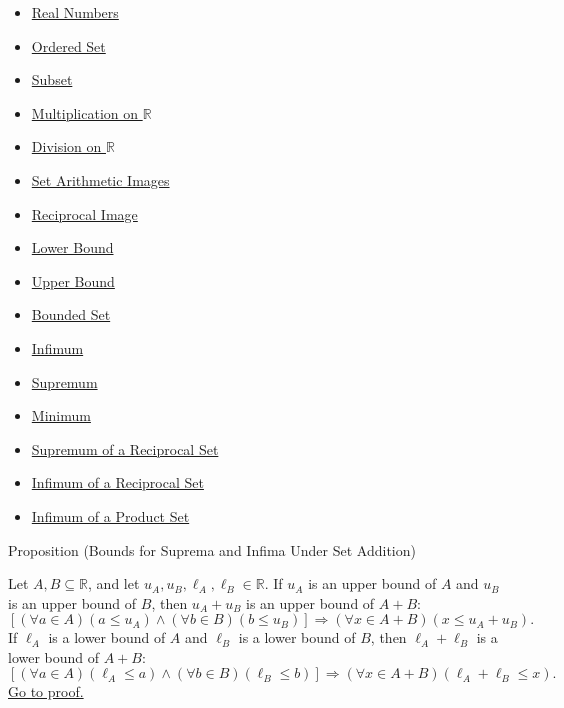 \begin{dependencies}
\begin{itemize}
  \item \hyperref[def:reals]{Real Numbers}
  \item \hyperref[def:ordered-set]{Ordered Set}
  \item \hyperref[def:subset]{Subset}
  \item \hyperref[def:multiplication-on-r]{Multiplication on $\mathbb{R}$}
  \item \hyperref[def:division-on-r]{Division on $\mathbb{R}$}
  \item \hyperref[def:set-arithmetic-images]{Set Arithmetic Images}
  \item \hyperref[def:reciprocal-image]{Reciprocal Image}
  \item \hyperref[def:real-lower-bound]{Lower Bound}
  \item \hyperref[def:real-upper-bound]{Upper Bound}
  \item \hyperref[def:bounded]{Bounded Set}
  \item \hyperref[def:infimum]{Infimum}
  \item \hyperref[def:supremum]{Supremum}
  \item \hyperref[def:minimum]{Minimum}
  \item \hyperref[thm:supremum-reciprocal-set]{Supremum of a Reciprocal Set}
  \item \hyperref[thm:infimum-reciprocal-set]{Infimum of a Reciprocal Set}
  \item \hyperref[thm:infimum-product-set]{Infimum of a Product Set}
\end{itemize}
\end{dependencies}

\begin{propositionbox}{Proposition (Bounds for Suprema and Infima Under Set Addition)}
\begin{proposition}
\label{prop:bounds-sum-set}
Let $A,B\subseteq\mathbb{R}$, and let
$u_A,u_B,\ell_A,\ell_B\in\mathbb{R}$.  If $u_A$ is an upper bound of $A$ and
$u_B$ is an upper bound of $B$, then $u_A+u_B$ is an upper bound of $A+B$:
\[
  \left[(\forall a\in A)(a\leq u_A)\land
  (\forall b\in B)(b\leq u_B)\right]
  \Longrightarrow
  (\forall x\in A+B)(x\leq u_A+u_B).
\]
If $\ell_A$ is a lower bound of $A$ and $\ell_B$ is a lower bound of $B$, then
$\ell_A+\ell_B$ is a lower bound of $A+B$:
\[
  \left[(\forall a\in A)(\ell_A\leq a)\land
  (\forall b\in B)(\ell_B\leq b)\right]
  \Longrightarrow
  (\forall x\in A+B)(\ell_A+\ell_B\leq x).
\]
\hyperref[prf:bounds-sum-set]{Go to proof.}
\end{proposition}
\end{propositionbox}

